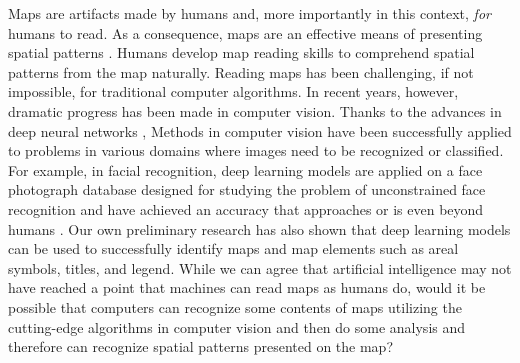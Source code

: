 

Maps are artifacts made by humans and, more importantly in this context, {\it for} humans to read. As a consequence, maps are an effective means of presenting spatial patterns \citep{kimerling2016map}. Humans develop map reading skills \citep{presson1982development,gilhooly1988skill} to comprehend spatial patterns from the map naturally. Reading maps has been challenging, if not impossible, for traditional computer algorithms. In recent years, however, dramatic progress has been made in computer vision. Thanks to the advances in deep neural networks \citep{Szeliski2021}, Methods in computer vision have been successfully applied to problems in various domains where images need to be recognized or classified. For example, in facial recognition, deep learning models are applied on a face photograph database designed for studying the problem of unconstrained face recognition and have achieved an accuracy that approaches or is even beyond humans \citep{Wang2021}. Our own preliminary research has also shown that deep learning models can be used to successfully identify maps and map elements such as areal symbols, titles, and legend. While we can agree that artificial intelligence may not have reached a point that machines can read maps as humans do, would it be possible that computers can recognize some contents of maps utilizing the cutting-edge algorithms in computer vision and then do some analysis and therefore can recognize spatial patterns presented on the map?

